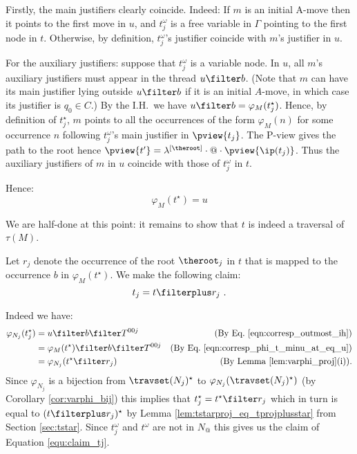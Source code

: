 \begin{enumerate}[$\bullet$]
\begin{enumerate}
\begin{itemize}
Firstly, the main justifiers clearly coincide. Indeed:
If $m$ is an initial A-move then it points to the first move in $u$, and $t_j^\omega$ is a free variable in $\Gamma$ pointing to the first node in $t$. Otherwise, by definition, $t_j^\omega$'s justifier coincide with $m$'s justifier in $u$.

For the auxiliary justifiers: suppose that $t_j^\omega$ is a variable node.
In $u$, all $m$'s auxiliary justifiers must appear in the thread $u\filter b$.
(Note that $m$ can have its main justifier lying outside $u\filter b$ if it is an initial $A$-move, in which case its justifier is $q_0 \in C$.)
By the I.H.\ we have $u\filter b = \varphi_M(t_j^\star)$. Hence, by definition of $t_j^\star$, $m$ points to
all the occurrences of the form $\varphi_M(n)$ for some occurrence $n$ following $t_j^\omega$'s main justifier in $\pview{t_j}$.
The P-view gives the path to the root hence $\pview{t'} = \lambda^{[\theroot]} \cdot @ \cdot \pview{\ip(t_j)}$.
Thus the auxiliary justifiers of $m$ in $u$ coincide with those of $t_j^\omega$ in $t$.

Hence:
        \begin{equation}
                \varphi_M(t^\star) =  u  \label{eqn:corresp_phi_t_minu_at_eq_u}
        \end{equation}
\smallskip

        We are half-done at this point: it remains to show that $t$ is indeed a traversal of $\tau(M)$.

        Let $r_j$ denote the occurrence of the root
        $\theroot_j$ in $t$ that is mapped to the
        occurrence $b$ in $\varphi_{M}(t^\star)$. We make the following claim:
        \begin{equation}
            t_j = t \filterplus r_j \ . \label{equ:claim_tj}
        \end{equation}

        Indeed we have:
        \begin{align*}
        \varphi_{N_j}(t_j^\star) &= u \filter b \filter T^{00j}
            & \mbox{(By Eq.\ \ref{eqn:corresp_outmost_ih})} \\
         &= \varphi_{M}(t^\star) \filter b \filter T^{00j}
            & \mbox{(By Eq.\ \ref{eqn:corresp_phi_t_minu_at_eq_u})} \\
         &= \varphi_{N_j}(t^\star \filter r_j )
            & \mbox{(By Lemma \ref{lem:varphi_proj}(i)).}
        \end{align*}
        Since $\varphi_{N_j}$ is a bijection from
        $\travset(N_j)^\star$ to $\varphi_{N_j}(
        \travset(N_j)^\star )$ (by Corollary
        \ref{cor:varphi_bij}) this implies that
        $t_j^\star = t^\star \filter r_j$ which in turn
         is equal to $(t\filterplus r_j)^\star$ by Lemma
         \ref{lem:tstarproj_eq_tprojplusstar} from
         Section
        \ref{sec:tstar}. Since $t_j^\omega$ and $t^\omega$ are not in $N_@$ this gives us
        the claim of Equation \ref{equ:claim_tj}.
    \smallskip


\end{itemize}
\end{enumerate}
\end{enumerate}

